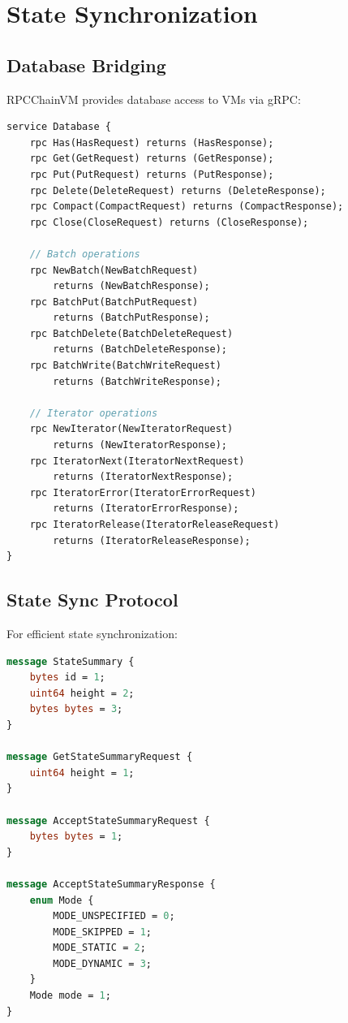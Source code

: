 \documentclass[11pt,letterpaper]{article}
\begin{document}
\section{State Synchronization}

\subsection{Database Bridging}

RPCChainVM provides database access to VMs via gRPC:

\begin{lstlisting}[language=protobuf, caption=Database Service]
service Database {
    rpc Has(HasRequest) returns (HasResponse);
    rpc Get(GetRequest) returns (GetResponse);
    rpc Put(PutRequest) returns (PutResponse);
    rpc Delete(DeleteRequest) returns (DeleteResponse);
    rpc Compact(CompactRequest) returns (CompactResponse);
    rpc Close(CloseRequest) returns (CloseResponse);

    // Batch operations
    rpc NewBatch(NewBatchRequest)
        returns (NewBatchResponse);
    rpc BatchPut(BatchPutRequest)
        returns (BatchPutResponse);
    rpc BatchDelete(BatchDeleteRequest)
        returns (BatchDeleteResponse);
    rpc BatchWrite(BatchWriteRequest)
        returns (BatchWriteResponse);

    // Iterator operations
    rpc NewIterator(NewIteratorRequest)
        returns (NewIteratorResponse);
    rpc IteratorNext(IteratorNextRequest)
        returns (IteratorNextResponse);
    rpc IteratorError(IteratorErrorRequest)
        returns (IteratorErrorResponse);
    rpc IteratorRelease(IteratorReleaseRequest)
        returns (IteratorReleaseResponse);
}
\end{lstlisting}

\subsection{State Sync Protocol}

For efficient state synchronization:

\begin{lstlisting}[language=protobuf, caption=State Sync Messages]
message StateSummary {
    bytes id = 1;
    uint64 height = 2;
    bytes bytes = 3;
}

message GetStateSummaryRequest {
    uint64 height = 1;
}

message AcceptStateSummaryRequest {
    bytes bytes = 1;
}

message AcceptStateSummaryResponse {
    enum Mode {
        MODE_UNSPECIFIED = 0;
        MODE_SKIPPED = 1;
        MODE_STATIC = 2;
        MODE_DYNAMIC = 3;
    }
    Mode mode = 1;
}
\end{lstlisting}
\end{document}
